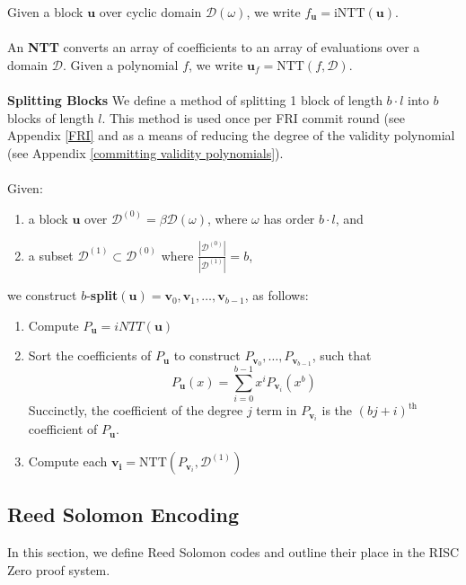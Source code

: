 \documentclass[10pt,letterpaper,titlepage]{article}
\newcommand{\w}[0]{\omega}
\newcommand{\D}[0]{\mathcal{D}}
\theoremstyle{definition}
\begin{document}
\begin{appendices}
Given a block $\mathbf{u}$ over cyclic domain $\D(\w)$, we write $f_{\mathbf{u}}=\text{iNTT}(\mathbf{u})$.  \\
\\
An \textbf{NTT} converts an array of coefficients to an array of evaluations over a domain $\D.$
Given a polynomial $f$, we write $\mathbf{u}_f = \text{NTT}(f,\D)$.\\
\\
\textbf{Splitting Blocks}
\label{split}
We define a method of splitting 1 block of length $b \cdot l$ into $b$ blocks of length $l$. 
This method is used once per FRI commit round (see Appendix \ref{FRI} and as a means of reducing the degree of the validity polynomial (see Appendix \ref{committing validity polynomials}).\\
\\
Given: 
\begin{enumerate}
  \item a block $\mathbf{u}$ over $\D^{(0)}=\beta\D(\w)$, where $\w$ has order $b \cdot l$, and
  \item a subset $\D^{(1)}\subset\D^{(0)}$ where $\frac{|\D^{(0)}|}{|\D^{(1)}|}=b$,
\end{enumerate}
we construct $b$-\textbf{split}$(\mathbf{u})=\mathbf{v}_0,\mathbf{v}_1,\ldots,\mathbf{v}_{b-1}$, as follows: 
\begin{enumerate}
  \item Compute $P_{\mathbf{u}} = iNTT(\mathbf{u})$
  \item Sort the coefficients of $P_{\mathbf{u}}$ to construct $P_{\mathbf{v}_0},\ldots,P_{\mathbf{v}_{b-1}}$, such that 
  \[P_{\mathbf{u}}(x)=\sum_{i=0}^{b-1}x^iP_{\mathbf{v}_i}(x^b)\]
  Succinctly, the coefficient of the degree $j$ term in $P_{\mathbf{v}_i}$ is the $(bj+i)^\text{th}$ coefficient of $P_\mathbf{u}$.
  \item Compute each $\mathbf{v_i} = \text{NTT}(P_{\mathbf{v}_i},\D^{(1)})$
\end{enumerate}
\subsection{Reed Solomon Encoding}
\label{reed solomon}
In this section, we define Reed Solomon codes and outline their place in the RISC Zero proof system.

\end{appendices}
\end{document}

